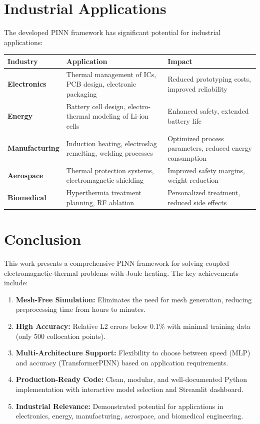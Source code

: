 \documentclass[11pt,a4paper]{article}
\begin{document}
\section{Industrial Applications}

The developed PINN framework has significant potential for industrial applications:

\begin{center}
\begin{tabular}{@{}p{3cm}p{5cm}p{5cm}@{}}
\toprule
\textbf{Industry} & \textbf{Application} & \textbf{Impact} \\
\midrule
\textbf{Electronics} & Thermal management of ICs, PCB design, electronic packaging & Reduced prototyping costs, improved reliability \\
\textbf{Energy} & Battery cell design, electro-thermal modeling of Li-ion cells & Enhanced safety, extended battery life \\
\textbf{Manufacturing} & Induction heating, electroslag remelting, welding processes & Optimized process parameters, reduced energy consumption \\
\textbf{Aerospace} & Thermal protection systems, electromagnetic shielding & Improved safety margins, weight reduction \\
\textbf{Biomedical} & Hyperthermia treatment planning, RF ablation & Personalized treatment, reduced side effects \\
\bottomrule
\end{tabular}
\end{center}

\section{Conclusion}

This work presents a comprehensive PINN framework for solving coupled electromagnetic-thermal problems with Joule heating. The key achievements include:

\begin{enumerate}
    \item \textbf{Mesh-Free Simulation:} Eliminates the need for mesh generation, reducing preprocessing time from hours to minutes.
    \item \textbf{High Accuracy:} Relative L2 errors below 0.1\% with minimal training data (only 500 collocation points).
    \item \textbf{Multi-Architecture Support:} Flexibility to choose between speed (MLP) and accuracy (TransformerPINN) based on application requirements.
    \item \textbf{Production-Ready Code:} Clean, modular, and well-documented Python implementation with interactive model selection and Streamlit dashboard.
    \item \textbf{Industrial Relevance:} Demonstrated potential for applications in electronics, energy, manufacturing, aerospace, and biomedical engineering.
\end{enumerate}
\end{document}
